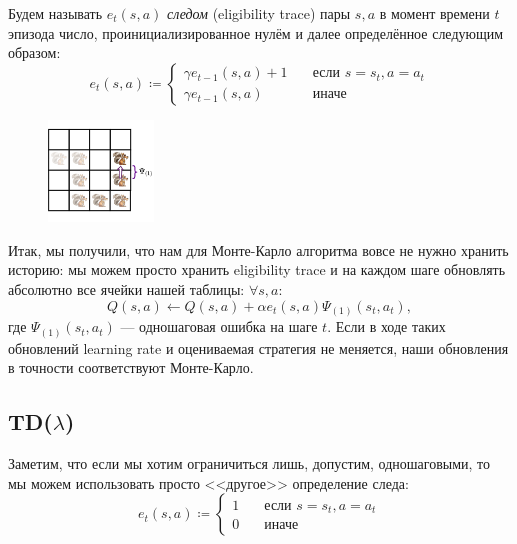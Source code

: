 \begin{definition}
Будем называть $e_t(s, a)$ \emph{следом} (eligibility trace) пары $s, a$ в момент времени $t$ эпизода число, проинициализированное нулём и далее определённое следующим образом:
$$e_t(s, a) \coloneqq \begin{cases}
\gamma e_{t - 1}(s, a) + 1 \quad & \text{если } s = s_t, a = a_t \\
\gamma e_{t - 1}(s, a) \quad & \text{иначе}
\end{cases}$$
\end{definition}

\begin{figure}
\vspace{-0.8cm}
\centering
\includegraphics[width=0.25\textwidth]{Images/EligibilityTrace.png}
\vspace{-0.6cm}
\end{figure}

Итак, мы получили, что нам для Монте-Карло алгоритма вовсе не нужно хранить историю: мы можем просто хранить eligibility trace и на каждом шаге обновлять абсолютно все ячейки нашей таблицы: $\forall s, a \colon$
\begin{equation}\label{eligibilitytraceupdate}
    Q(s, a) \leftarrow Q(s, a) + \alpha e_t(s, a) \Psi_{(1)}(s_t, a_t),
\end{equation}
где $\Psi_{(1)}(s_t, a_t)$ --- одношаговая ошибка на шаге $t$. Если в ходе таких обновлений learning rate и оцениваемая стратегия не меняется, наши обновления в точности соответствуют Монте-Карло.

\subsection{TD($\lambda$)}

Заметим, что если мы хотим ограничиться лишь, допустим, одношаговыми, то мы можем использовать просто <<другое>> определение следа:
$$e_t(s, a) \coloneqq \begin{cases}
1 \quad & \text{если } s = s_t, a = a_t \\
0 \quad & \text{иначе}
\end{cases}$$


